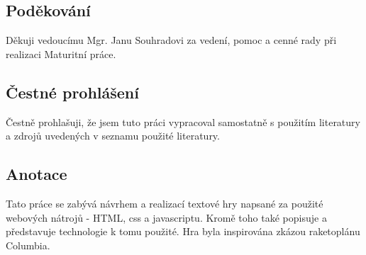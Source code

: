 \documentclass[main.tex]{subfiles}
\begin{document}
\subsection*{Poděkování}
Děkuji vedoucímu Mgr. Janu Souhradovi za vedení, pomoc a cenné rady při realizaci Maturitní práce. 

\subsection*{Čestné prohlášení}
Čestně prohlašuji, že jsem tuto práci vypracoval samostatně s použitím literatury a zdrojů uvedených v seznamu použité literatury.

\subsection*{Anotace}
Tato práce se zabývá návrhem a realizací textové hry napsané za použité webových nátrojů - HTML, css a javascriptu. Kromě toho také popisuje a představuje technologie k tomu použité. Hra byla inspirována zkázou raketoplánu Columbia. 
\end{document}
